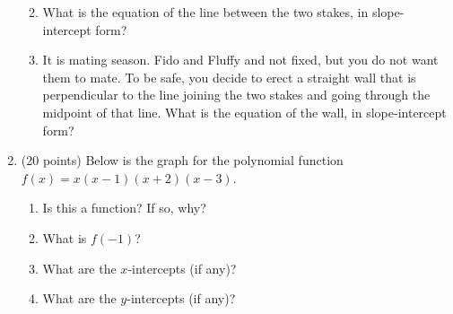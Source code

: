 \documentclass[letterpaper,12pt,fleqn]{article}
\begin{document}
\begin{enumerate}
\begin{enumerate}
\vspace{1.5in}

\item What is the equation of the line between the two stakes, in
slope-intercept form?

\vspace{1.5in}

\item It is mating season. Fido and Fluffy and not fixed, but you do not want
them to mate. To be safe, you decide to erect a straight wall that is
perpendicular to the line joining the two stakes and going through the midpoint
of that line. What is the equation of the wall, in slope-intercept form?
\end{enumerate}

\newpage

\item (20 points) Below is the graph for the polynomial function
  $f(x)=x(x-1)(x+2)(x-3)$.


  \begin{enumerate}
  \item Is this a function? If so, why?

    \vspace{1in}
    
  \item What is $f(-1)$?

    \vspace{1in}

  \item What are the $x$-intercepts (if any)?

    \vspace{1in}

  \item What are the $y$-intercepts (if any)?

    \vspace{1in}


\end{enumerate}
\end{enumerate}
\end{document}
